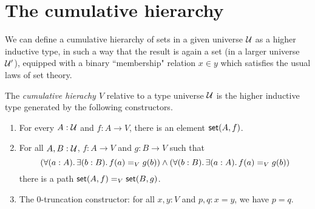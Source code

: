 %
%
%
%

\section{The cumulative hierarchy}
\label{sec:cumulative-hierarchy}

We can define a cumulative hierarchy of sets in a given universe $\UU$ as a higher inductive type, in such a way that the result is again a set (in a larger universe $\UU'$), equipped with a binary ``membership" relation $x\in y$ which satisfies the usual laws of set theory.

\begin{defn}
  The \emph{cumulative hierachy $V$} relative to a type universe $\UU$ is the
  higher inductive type generated by the following constructors.
  \begin{enumerate}
  \item For every $A : \UU$ and $f : A \to V$, there is an element $\vset(A, f)$.
  \item For all $A, B : \UU$, $f : A \to V$ and $g : B \to V$ such that
    \begin{equation} \label{eq:V-path}
      (\fall{a:A} \exis{b:B} \id[V]{f(a)}{g(b)}) \land (\fall{b:B} \exis{a:A} \id[V]{f(a)}{g(b)})
    \end{equation}
    there is a path $\id[V]{\vset(A,f)}{\vset(B,g)}$.
  \item The 0-truncation constructor: for all $x,y:V$ and $p,q:x=y$, we have $p=q$.
  \end{enumerate}
\end{defn}

